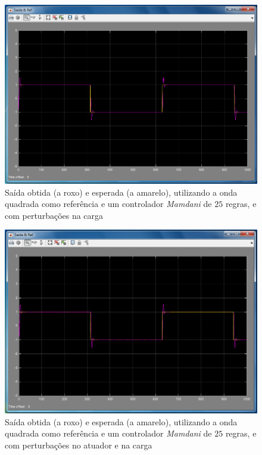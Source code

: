 \documentclass{article}
\begin{document}
\begin{figure}[h]
  \centering
      \includegraphics[scale=0.3]{Images/Mamdani_25_square_charge.png}
  \caption{Saída obtida (a roxo) e esperada (a amarelo), utilizando a onda quadrada como referência e um controlador \emph{Mamdani} de $25$ regras, e com perturbações na carga}
\end{figure}

\begin{figure}[h]
  \centering
      \includegraphics[scale=0.3]{Images/Mamdani_25_square_actuator_charge.png}
  \caption{Saída obtida (a roxo) e esperada (a amarelo), utilizando a onda quadrada como referência e um controlador \emph{Mamdani} de $25$ regras, e com perturbações no atuador e na carga}
\end{figure}
\end{document}

